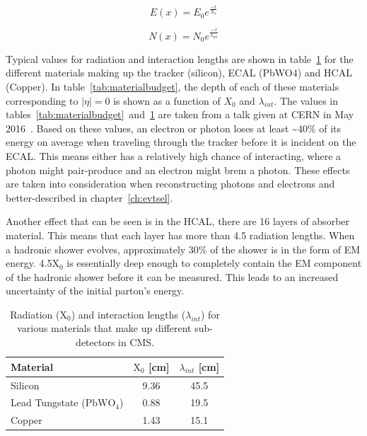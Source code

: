 \begin{equation}
  \label{eqn:radiation_length}
  E(x) = E_{0}e^{\frac{-x}{X_{0}}}  
\end{equation}

\begin{equation}
  \label{eqn:interaction_length}
  N(x) = N_{0}e^{\frac{-x}{\lambda_{int}}}  
\end{equation}

Typical values for radiation and interaction lengths are shown in table~\ref{tab:rad_int_lengths}
for the different materials making up the tracker (silicon), ECAL (PbWO4) and HCAL (Copper).
In table~\ref{tab:materialbudget}, the depth of each of these materials corresponding to $|\eta| = 0$ is shown as a function of $X_{0}$ and $\lambda_{int}$.
The values in tables~\ref{tab:materialbudget}~and~\ref{tab:rad_int_lengths} are taken from a talk given at CERN in May 2016~\cite{calorimetry}.
Based on these values, an electron or photon loses at least \textasciitilde{}40\%
of its energy on average when traveling through the tracker before it is incident on the ECAL.
This means either has a relatively high chance of interacting, where a photon might pair-produce and an electron might brem a photon.
These effects are taken into consideration when reconstructing photons and electrons and better-described in chapter~\ref{ch:evtsel}.

Another effect that can be seen is in the HCAL, there are 16 layers of absorber material.
This means that each layer has more than 4.5 radiation lengths.
When a hadronic shower evolves, approximately 30\% of the shower is in the form of EM energy.
4.5$\mathrm{X_{0}}$ is essentially deep enough to completely contain the EM component of the hadronic shower before it can be measured.
This leads to an increased uncertainty of the initial parton's energy.

\begin{table}[htb]                                                                                                                                                              
  \begin{center}
    \caption{
      \label{tab:rad_int_lengths}
      Radiation ($\mathrm{X_{0}}$) and interaction lengths ($\lambda_{int}$) for various materials that make up different sub-detectors in CMS.
    }
    \begin{tabular}{l|c|c}
      \hline
      \hline
      Material & $\mathrm{X_{0}}$ [cm] & $\lambda_{int}$ [cm] \\
      \hline
      Silicon                             & 9.36 & 45.5 \\
      Lead Tungstate (PbW$\mathrm{O_{4}}$) & 0.88 & 19.5 \\
      Copper                              & 1.43 & 15.1 \\
      \hline
      \hline
    \end{tabular}
  \end{center}
\end{table}

